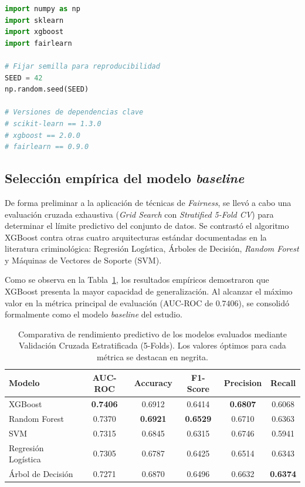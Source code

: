 \documentclass[11pt,a4paper]{article}
\begin{document}
\begin{lstlisting}[caption={Semilla aleatoria y dependencias principales en el entorno de experimentación.}, language=Python]
import numpy as np
import sklearn
import xgboost
import fairlearn

# Fijar semilla para reproducibilidad
SEED = 42
np.random.seed(SEED)

# Versiones de dependencias clave
# scikit-learn == 1.3.0
# xgboost == 2.0.0
# fairlearn == 0.9.0
\end{lstlisting}

\subsection{Selección empírica del modelo \textit{baseline}}
\label{subsec:resultados_baseline}

De forma preliminar a la aplicación de técnicas de \textit{Fairness}, se llevó a cabo una evaluación cruzada exhaustiva (\textit{Grid Search} con \textit{Stratified 5-Fold CV}) para determinar el límite predictivo del conjunto de datos. Se contrastó el algoritmo XGBoost contra otras cuatro arquitecturas estándar documentadas en la literatura criminológica: Regresión Logística, Árboles de Decisión, \textit{Random Forest} y Máquinas de Vectores de Soporte (SVM). 

Como se observa en la Tabla~\ref{tab:comparativa_modelos}, los resultados empíricos demostraron que XGBoost presenta la mayor capacidad de generalización. Al alcanzar el máximo valor en la métrica principal de evaluación (AUC-ROC de $0.7406$), se consolidó formalmente como el modelo \textit{baseline} del estudio.

\begin{table}[H]
\centering
\caption{Comparativa de rendimiento predictivo de los modelos evaluados mediante Validación Cruzada Estratificada (5-Folds). Los valores óptimos para cada métrica se destacan en negrita.}
\label{tab:comparativa_modelos}
\small
\begin{tabular}{lccccc}
\toprule
\textbf{Modelo} & \textbf{AUC-ROC} & \textbf{Accuracy} & \textbf{F1-Score} & \textbf{Precision} & \textbf{Recall} \\
\midrule
XGBoost & \textbf{0.7406} & 0.6912 & 0.6414 & \textbf{0.6807} & 0.6068 \\
Random Forest & 0.7370 & \textbf{0.6921} & \textbf{0.6529} & 0.6710 & 0.6363 \\
SVM & 0.7315 & 0.6845 & 0.6315 & 0.6746 & 0.5941 \\
Regresión Logística & 0.7305 & 0.6787 & 0.6425 & 0.6514 & 0.6343 \\
Árbol de Decisión & 0.7271 & 0.6870 & 0.6496 & 0.6632 & \textbf{0.6374} \\
\bottomrule
\end{tabular}
\end{table}
\end{document}
